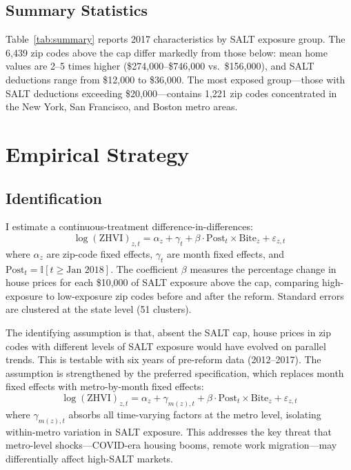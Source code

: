 \documentclass[12pt]{article}
\newcommand{\ind}{\mathbb{I}}
\begin{document}
\subsection{Summary Statistics}



Table~\ref{tab:summary} reports 2017 characteristics by SALT exposure group. The 6,439 zip codes above the cap differ markedly from those below: mean home values are 2--5 times higher (\$274,000--\$746,000 vs.\ \$156,000), and SALT deductions range from \$12,000 to \$36,000. The most exposed group---those with SALT deductions exceeding \$20,000---contains 1,221 zip codes concentrated in the New York, San Francisco, and Boston metro areas.

\section{Empirical Strategy}

\subsection{Identification}

I estimate a continuous-treatment difference-in-differences:
\begin{equation}\label{eq:main}
\log(\text{ZHVI})_{z,t} = \alpha_z + \gamma_t + \beta \cdot \text{Post}_t \times \text{Bite}_z + \varepsilon_{z,t}
\end{equation}
where $\alpha_z$ are zip-code fixed effects, $\gamma_t$ are month fixed effects, and $\text{Post}_t = \ind[t \geq \text{Jan 2018}]$. The coefficient $\beta$ measures the percentage change in house prices for each \$10,000 of SALT exposure above the cap, comparing high-exposure to low-exposure zip codes before and after the reform. Standard errors are clustered at the state level (51 clusters).

The identifying assumption is that, absent the SALT cap, house prices in zip codes with different levels of SALT exposure would have evolved on parallel trends. This is testable with six years of pre-reform data (2012--2017). The assumption is strengthened by the preferred specification, which replaces month fixed effects with metro-by-month fixed effects:
\begin{equation}\label{eq:metro}
\log(\text{ZHVI})_{z,t} = \alpha_z + \gamma_{m(z),t} + \beta \cdot \text{Post}_t \times \text{Bite}_z + \varepsilon_{z,t}
\end{equation}
where $\gamma_{m(z),t}$ absorbs all time-varying factors at the metro level, isolating within-metro variation in SALT exposure. This addresses the key threat that metro-level shocks---COVID-era housing booms, remote work migration---may differentially affect high-SALT markets.
\end{document}
